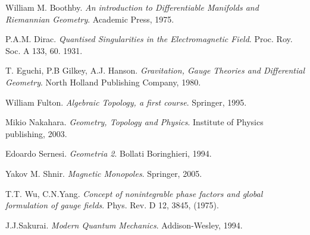 \begin{thebibliography}{9}

William M. Boothby.
\textit{An introduction to Differentiable Manifolds and Riemannian Geometry}.
Academic Press, 1975.

P.A.M. Dirac.
\textit{Quantised Singularities in the Electromagnetic Field}.
Proc. Roy. Soc. A 133, 60. 1931.

T. Eguchi, P.B Gilkey, A.J. Hanson.
\textit{Gravitation, Gauge Theories and Differential Geometry}.
North Holland Publishing Company, 1980.

  William Fulton.
  \textit{Algebraic Topology, a first course}.
  Springer, 1995.

   Mikio Nakahara.
   \textit{Geometry, Topology and Physics}.
   Institute of Physics publishing, 2003.

   Edoardo Sernesi.
   \textit{Geometria 2}.
   Bollati Boringhieri, 1994.

  Yakov M. Shnir.
  \textit{Magnetic Monopoles}.
  Springer, 2005.

   T.T. Wu, C.N.Yang.
   \textit{Concept of nonintegrable phase factors and global formulation of gauge fields}.
   Phys. Rev. D 12, 3845, (1975).


  J.J.Sakurai.
  \textit{Modern Quantum Mechanics}.
  Addison-Wesley, 1994.

\end{thebibliography}
